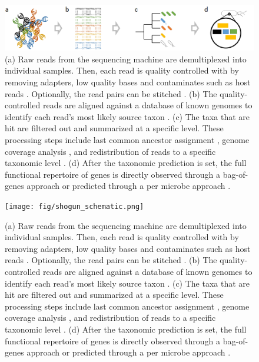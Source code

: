 \documentclass[conference,11pt]{IEEEtran}
\begin{document}
\begin{figure}[hbt]
    \centering
    \includegraphics[width=0.8\linewidth]{fig/taxonomic_profiler.png}
    \caption{(a) Raw reads from the sequencing machine are demultiplexed into individual samples. Then, each read is quality controlled with by removing adapters, low quality bases and contaminates such as host reads \cite{consortium_structure_2012}. Optionally, the read pairs can be stitched \cite{magoc_flash:_2011}. (b) The quality-controlled reads are aligned against a database of known genomes to identify each read's most likely source taxon \cite{langmead_fast_2012}. (c) The taxa that are hit are filtered out and summarized at a specific level. These processing steps include last common ancestor assignment \cite{hong_pathoscope_2014}, genome coverage analysis \cite{wood_kraken:_2014}, and redistribution of reads to a specific taxonomic level \cite{lu_bracken:_2017}. (d) After the taxonomic prediction is set, the full functional repertoire of genes is directly observed through a bag-of-genes approach or predicted through a per microbe approach \cite{langille_predictive_2013}.}
      \label{fig:taxonomic_profiler}
\end{figure}

\begin{figure}[hbt]
    \centering
    \texttt{[image: fig/shogun\_schematic.png]}
    \caption{(a) Raw reads from the sequencing machine are demultiplexed into individual samples. Then, each read is quality controlled with by removing adapters, low quality bases and contaminates such as host reads \cite{consortium_structure_2012}. Optionally, the read pairs can be stitched \cite{magoc_flash:_2011}. (b) The quality-controlled reads are aligned against a database of known genomes to identify each read's most likely source taxon \cite{langmead_fast_2012}. (c) The taxa that are hit are filtered out and summarized at a specific level. These processing steps include last common ancestor assignment \cite{hong_pathoscope_2014}, genome coverage analysis \cite{wood_kraken:_2014}, and redistribution of reads to a specific taxonomic level \cite{lu_bracken:_2017}. (d) After the taxonomic prediction is set, the full functional repertoire of genes is directly observed through a bag-of-genes approach or predicted through a per microbe approach \cite{langille_predictive_2013}.}
      \label{fig:shogun_schematic}
\end{figure}
\end{document}
